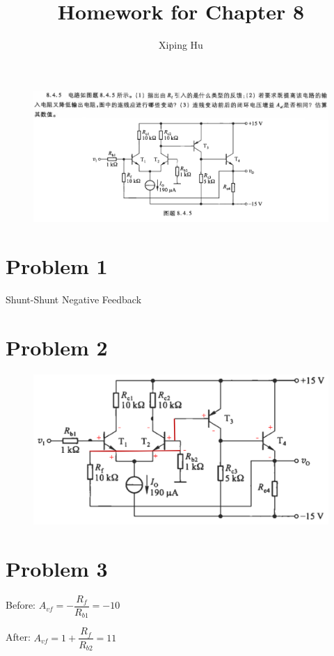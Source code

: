 \documentclass{article}
\author{Xiping Hu}
\affil{https://hxp.plus/}
\title{Homework for Chapter 8}
\begin{document}
\maketitle

\begin{figure}[H]
  \centering
  \includegraphics[width=\linewidth]{figures/Problem845}
\end{figure}

\section{Problem 1}

Shunt-Shunt Negative Feedback

\section{Problem 2}

\begin{figure}[H]
  \centering
  \includegraphics[width=0.7\linewidth]{figures/Problem8451}
\end{figure}

\section{Problem 3}

Before: $A_{vf} = - \dfrac{R_f}{R_{b1}} = - 10 $

After: $A_{vf} = 1 + \dfrac{R_f}{R_{b2}} = 11 $
\end{document}

